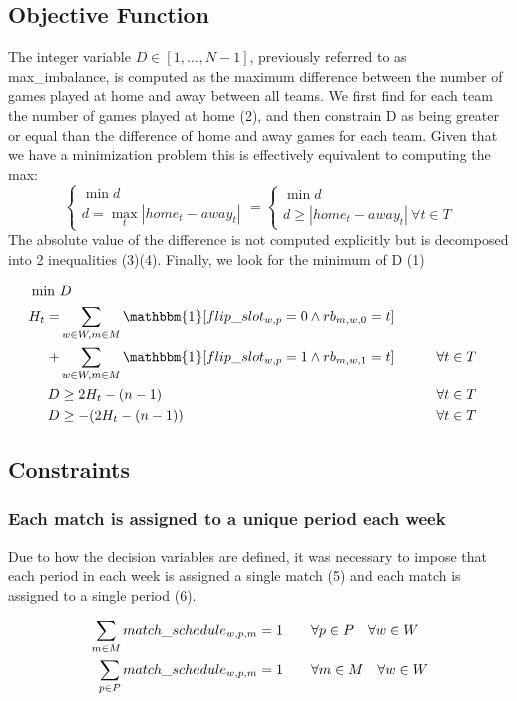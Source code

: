 \subsection{Objective Function}
The integer variable $D \in [1, \dots, N-1]$, previously referred to as max\_imbalance, is computed as the maximum difference between the number of games played at home and away between all teams. We first find for each team the number of games played at home (2), and then constrain D as being greater or equal than the difference of home and away games for each team. Given that we have a minimization problem this is effectively equivalent to computing the max: 
$$\begin{cases}
    \min d \\
    d = \max_t |home_t - away_t|
\end{cases} = \begin{cases}
    \min d \\
    d \geq |home_t - away_t| \ \forall t \in T
\end{cases}$$The absolute value of the difference is not computed explicitly but is decomposed into 2 inequalities (3)(4). Finally, we look for the minimum of D (1)

\begin{align}
    \min \ &D \\
    H_t =& \sum_{w \in W, m \in M} \mathbbm{1}[flip\_slot_{w,p} = 0 \land rb_{m,w,0} = t] \notag \\
    +& \sum_{w \in W, m \in M} \mathbbm{1}[flip\_slot_{w,p} = 1 \land rb_{m, w,1} = t] \hspace{20px}  && \forall t \in T\\
    D &\geq 2H_t - (n-1) && \forall t \in T\\
    D & \geq -(2 H_t - (n-1)) && \forall t \in T
\end{align}

\subsection{Constraints}
\subsubsection{Each match is assigned to a unique period each week}
Due to how the decision variables are defined, it was necessary to impose that each period in each week is assigned a single match (5) and each match is assigned to a single period (6).

\begin{align}
    \sum_{m \in M} match\_schedule_{w,p,m} &= 1 \hspace{20px} \forall p \in P \hspace{10px} \forall w \in W\\
    \sum_{p \in P} match\_schedule_{w,p,m} &= 1 \hspace{20px} \forall m \in M \hspace{10px}\forall w \in W
\end{align}

